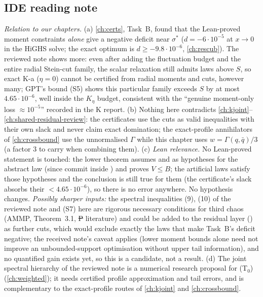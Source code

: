 \subsection{IDE reading note}\label{sec:spectral-reading}
\emph{Relation to our chapters.} (a) \autoref{ch:certs}, Task~B, found that the Lean-proved moment constraints \emph{alone} give a negative deficit near $\sigma^*$ ($d=-6\cdot10^{-5}$ at
$x\to0$ in the HiGHS solve; the exact optimum is $d\ge-9.8\cdot10^{-6}$, \autoref{ch:rescub}). The reviewed note shows more: even after adding the fluctuation budget and the entire radial Stein-cut family, the scalar relaxation still admits laws above $S$, so exact K-a
($\eta=0$) cannot be certified from radial moments and cuts, however many; GPT's bound (S5) shows this particular family exceeds $S$ by at most $4.65\cdot10^{-6}$, well inside the $K_\eta$
budget, consistent with the ``genuine moment-only loss $\approx10^{-5}$'' recorded in the K report. (b) Nothing here contradicts \autoref{ch:kjoint}--\autoref{ch:shared-residual-review}:
the certificates use the cuts as valid inequalities with their own slack and never claim exact domination; the exact-profile annihilators of \autoref{ch:crossbound} use the unnormalised
$\Gamma$ while this chapter uses $w=\Gamma(q,\bar q)/3$ (a factor $3$ to carry when combining them). (c) \emph{Lean relevance.} No Lean-proved statement is touched: the lower theorem assumes
 and  as hypotheses for the abstract law (since commit  inside ) and proves $V\le B$; the artificial laws satisfy those hypotheses and the conclusion is still true for them (the
certificate's slack absorbs their $<4.65\cdot10^{-6}$), so there is no error anywhere. No hypothesis changes. \emph{Possibly sharper inputs:} the spectral inequalities (9), (10) of the reviewed
note and (S7) here are rigorous necessary conditions for third chaos (AMMP, Theorem~3.1, \st{P} literature) and could be added to the residual layer () as further cuts, which
would exclude exactly the laws that make Task~B's deficit negative; the received note's caveat applies (lower moment bounds alone need not improve an unbounded-support optimisation without
upper tail information), and no quantified gain exists yet, so this is a candidate, not a result. (d) The joint spectral hierarchy of the reviewed note is a numerical research proposal for
(T$_0$) (\autoref{ch:weighted}); it needs certified profile approximation and tail errors, and is complementary to the exact-profile routes of \autoref{ch:kjoint} and \autoref{ch:crossbound}.
